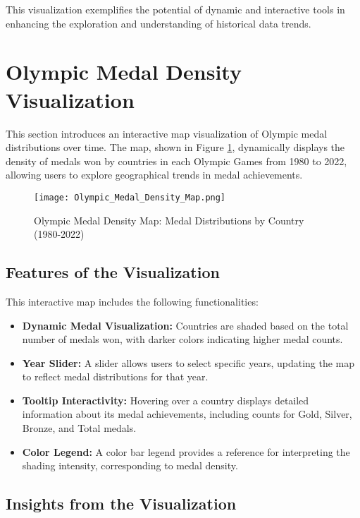 This visualization exemplifies the potential of dynamic and interactive tools in enhancing the exploration and understanding of historical data trends.


\section{Olympic Medal Density Visualization}

This section introduces an interactive map visualization of Olympic medal distributions over time. The map, shown in Figure \ref{fig:olympic_medal_density_map}, dynamically displays the density of medals won by countries in each Olympic Games from 1980 to 2022, allowing users to explore geographical trends in medal achievements.

\begin{figure}[ht]
    \centering
    \texttt{[image: Olympic\_Medal\_Density\_Map.png]}
    \caption{Olympic Medal Density Map: Medal Distributions by Country (1980-2022)}
    \label{fig:olympic_medal_density_map}
\end{figure}

\subsection{Features of the Visualization}

This interactive map includes the following functionalities:
\begin{itemize}
    \item \textbf{Dynamic Medal Visualization:} Countries are shaded based on the total number of medals won, with darker colors indicating higher medal counts.
    \item \textbf{Year Slider:} A slider allows users to select specific years, updating the map to reflect medal distributions for that year.
    \item \textbf{Tooltip Interactivity:} Hovering over a country displays detailed information about its medal achievements, including counts for Gold, Silver, Bronze, and Total medals.
    \item \textbf{Color Legend:} A color bar legend provides a reference for interpreting the shading intensity, corresponding to medal density.
\end{itemize}

\subsection{Insights from the Visualization}

